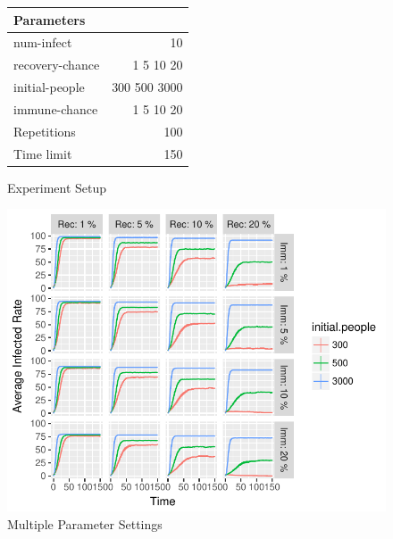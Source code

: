 \documentclass[a4paper,reqno,]{article}
\begin{document}
\begin{figure}[H]
\begin{minipage}[b]{0.35\linewidth}
\centering
\begin{tabular}{lr}
 	\toprule
    Parameters & \\
    \midrule
    num-infect & 10 \\
    recovery-chance & 1 5 10 20 \\
    initial-people & 300 500 3000 \\
    immune-chance & 1 5 10 20\\
    \midrule
    Repetitions & 100 \\
    Time limit & 150 \\
    \bottomrule
\end{tabular}
  \caption{Experiment Setup}
  \label{tab:final_settings}
\end{minipage}
\begin{minipage}[b]{{0.75\linewidth}}
\centering
\includegraphics[width={1\textwidth}]{images/ABM/combinednew.pdf}
\caption{Multiple Parameter Settings}
\label{fig:final_plots}
\end{minipage}
\end{figure}
\end{document}
